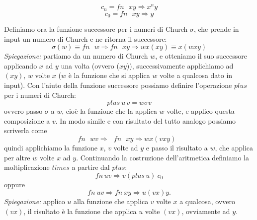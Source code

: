 \documentclass{article}
\theoremstyle{definition}
\theoremstyle{definition}
\theoremstyle{definition}
\theoremstyle{remark}
\begin{document}
$$c_n = fn\text{ $xy$}\Rightarrow x^n y$$
$$c_0 = fn\text{ $xy$}\Rightarrow  y$$

Definiamo ora la funzione successore per i numeri di Church $\sigma$, che prende in input un numero di Church e ne ritorna il successore:
$$\sigma(w) \equiv fn\text{ }w\Rightarrow fn\text{ }xy \Rightarrow wx(xy)\equiv x(wxy)$$
\textit{Spiegazione:} partiamo da un numero di Church $w$, e otteniamo il suo successore applicando $x$ ad $y$ una volta (ovvero ($xy$)),  successivamente applichiamo ad $(xy)$, $w$ volte $x$ ($w$ è la funzione che si applica $w$ volte a qualcosa dato in input).
Con l'aiuto della funzione successore possiamo definire l'operazione $plus$ per i numeri di Church:
$$plus\:u\,v = w \sigma v$$
ovvero passo $\sigma$ a $w$, cioè la funzione che la applica $w$ volte, e applico questa composizione a $v$. In modo simile e con risultato del tutto analogo
possiamo scriverla come
$$fn \text{ $wv\Rightarrow$ $fn$ $xy\Rightarrow wx(vxy)$ }$$
quindi applichiamo la funzione $x$, $v$ volte ad $y$ e passo il risultato a $w$, che applica per altre $w$ volte $x$ ad $y$.
Continuando la costruzione dell'aritmetica definiamo la moltiplicazione $times$ a partire dal $plus$:
$$fn\, uv\Rightarrow v(plus\, u)\:c_0$$
oppure
$$fn\: uv\Rightarrow fn\: xy\Rightarrow u(vx)y.$$
\textit{Spiegazione:} applico $u$ alla funzione che applica $v$ volte  $x$ a qualcosa, ovvero $(vx)$, il risultato è la funzione che applica $u$ volte  $(vx)$, ovviamente ad $y$.
\end{document}
